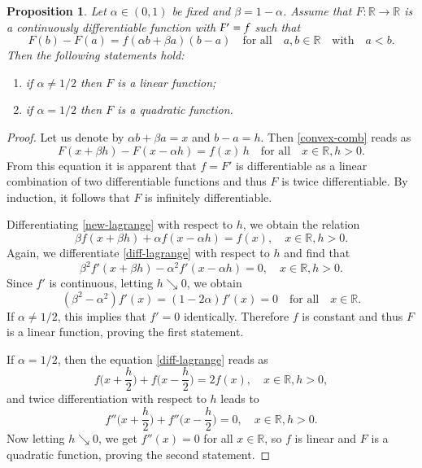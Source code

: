 \documentclass{birkjour}
\newtheorem{proposition}[theorem]{Proposition}
\begin{document}
\begin{proposition}\label{lagrange}
Let $\alpha \in (0,1)$ be fixed and $\beta= 1-\alpha$. 
Assume that $F:{{\mathbb R}} \to {{\mathbb R}}$ is a continuously differentiable function with $F\rq{}=f$  such that 
\begin{equation} \label{convex-comb}
F(b)-F(a)= f(\alpha b+ \beta a) (b-a) \quad \text{for all} \quad a,b\in {{\mathbb R}} \quad \text{with} \quad a<b.
\end{equation} 
Then the following statements hold:
\begin{enumerate} 
\item if $\alpha \neq 1/2$ then $F$ is a linear function;
\item if $\alpha = 1/2$ then $F$ is a quadratic function.
\end{enumerate}
\end{proposition}

\begin{proof}
Let us denote by $\alpha b+ \beta a= x$ and $b-a= h$. Then \eqref{convex-comb} reads as 
\begin{equation} \label{new-lagrange}
F(x+\beta h) -F(x-\alpha h)= f(x)\,h \quad \text{for all} \quad x \in {{\mathbb R}}, h>0.
\end{equation} 
From this equation it is apparent that $f=F'$ is differentiable as a linear combination of two differentiable functions and thus $F$ is twice differentiable. By induction, it follows that $F$ is 
infinitely differentiable.

Differentiating \eqref{new-lagrange} with respect to $h$, we obtain the relation
\begin{equation} \label{diff-lagrange}
\beta f(x+\beta h) + \alpha f(x-\alpha h) = f(x), \quad 
x \in {{\mathbb R}}, h>0.
 \end{equation}
Again, we differentiate \eqref{diff-lagrange} with respect to $h$ and find that
\begin{equation*}
\beta^2 f'(x+\beta h) -\alpha^2 f'(x-\alpha h) =0, \quad 
x \in {{\mathbb R}}, h>0.
\end{equation*}
Since $f'$ is continuous, letting $h \searrow 0$, we obtain 
$$ (\beta^2-\alpha^2) f'(x)=(1-2\alpha)f'(x)=0 \quad \text{for all} \quad x\in {{\mathbb R}}.$$
If $\alpha \neq 1/2$, this implies that $f'=0$ identically. Therefore $f$ is constant and thus $F$ is a linear function, proving the first statement. 

If $\alpha = 1/2$, then the equation \eqref{diff-lagrange} reads as
\begin{equation*}
f\bigl(x+\frac{h}{2}\bigr) +f\bigl(x-\frac{h}{2}\bigr)= 2 f(x), \quad 
x \in {{\mathbb R}}, h>0,
\end{equation*}
and twice differentiation with respect to $h$ leads to
\begin{equation*}
f''\bigl(x+\frac{h}{2}\bigr) + f''\bigl(x-\frac{h}{2}\bigr) = 0, \quad 
x \in {{\mathbb R}}, h>0.
\end{equation*}
Now letting $h \searrow 0$, we get $f''(x)=0$ for all $x\in{{\mathbb R}}$, so $f$ is linear and $F$ is a quadratic function, proving the second statement.
\end{proof} 
\end{document}
